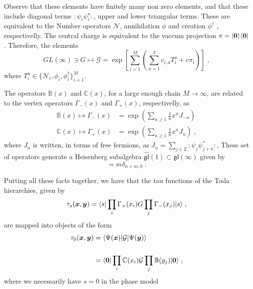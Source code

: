 \documentclass[a4paper,11pt]{amsart}
\begin{document}
Observe that these elements have finitely many non zero elements, and
that these include diagonal terms \(\bm{\colon} \psi_i
\psi_i^\star\bm{\colon}\), upper and lower triangular terms. These are
equivalent to the Number operators \(\mathcal{N}\), annihilation
\(\phi\) and creation \(\phi^\dagger\) , respectivelly.  The central
charge is equivalent to the vaccum projection \(\pi =
\lvert\bm{0}\rangle\langle\bm{0}\rvert\). Therefore, the elements
\begin{equation}
   GL(\infty) \ni G \mapsto
   \mathcal{G} = \exp \left[\sum_{i=1}^M \left( \sum_{a=1}^3
   c_{i, a} T_i^{a}  + c \pi_i \right)\right]\; ,
\end{equation}
where \(T^{a}_i \in \{ \mathcal{N}_i, \phi_i, \phi_i^\dagger \}_{i=1}^M\). 

The operators \(\mathbb{B}(x)\) and \(\mathbb{C}(x)\), 
for a large enough chain \(M\to \infty\),
are related to the vertex operators
\(\Gamma_-(x)\) and \(\Gamma_+(x)\), respectivelly, as
\begin{equation}
  \begin{split}
    \mathbb{B}(x) \mapsto \Gamma_-(x) & = \exp \left( \sum_{n\geq 1} \frac{1}{n}x^n J_{-n}\right) \\
    \mathbb{C}(x) \mapsto \Gamma_+(x) & = \exp \left( \sum_{n\geq 1} \frac{1}{n}x^n J_{n}\right) \; ,
  \end{split}
\end{equation}
where \(J_n \) is written, in terms of free fermions, as \(J_n =
\sum_{j\in \mathbb{Z}} \bm{\colon} \psi_j \psi_{j+n}^\ast
\bm{\colon}\),
These set of operators generate a Heisenberg subalgebra
\(\widehat{\mathfrak{gl}}(1) \subset \mathfrak{gl}(\infty)\) given by
\begin{equation}
  [J_m, J_n] = m \delta_{n+m,0}\; .
\end{equation}

Putting all these facts together, we have that the tau functions of the Toda 
hierarchies, given by
\begin{equation}
  \tau_s(\bm{x}, \bm{y}) = \langle s\rvert \prod_{i} \Gamma_+(x_i) G \prod_j \Gamma_-(x_j) \lvert s\rangle\; ,
\end{equation}
are mapped into objects of the form 
\begin{equation}
\begin{split}
  \tau_0(\bm{x}, \bm{y}) & = \langle\Psi(\bm{x})\rvert \mathcal{G} \lvert\Psi(\bm{y})\rangle \\
  \\ & = \langle\bm{0}\rvert \prod_{i} \mathbb{C}(x_i)
  \mathcal{G} \prod_j \mathbb{B}(y_j) \lvert\bm{0}\rangle\; ,
\end{split}
\end{equation}
where we necessarily have \(s=0\) in the phase model
\end{document}
